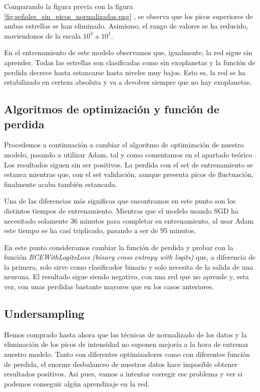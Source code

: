 Comparando la figura previa con la figura \ref{fig:señales_sin_picos_normalizadas.png} , se observa que los picos superiores de ambas estrellas se han eliminado. Asimismo, el rango de valores se ha reducido, moviendonos de la escala $10^3$ a $10^1$.


En el entrenamiento de este modelo observamos que, igualmente, la red sigue sin aprender. Todas las estrellas son clasificadas como sin exoplanetas y la función de perdida decrece hasta estancarse hasta niveles muy bajos. Esto es, la red se ha estabilizado en certeza absoluta y va a devolver siempre que no hay exoplanetas.

\subsection{Algoritmos de optimización y función de perdida}

Procedemos a continuación a cambiar el algoritmo de optimización de nuestro modelo, pasando a utilizar Adam, tal y como comentamos en el apartado teórico . Los resultados siguen sin ser positivos. La perdida con el set de entrenamiento se estanca mientras que, con el set validación, aunque presenta picos de fluctuación, finalmente acaba también estancada.

Una de las diferencias más significas que encontramos en este punto son los distintos tiempos de entrenamiento. Mientras que el modelo usando SGD ha necesitado solamente 36 minutos para completar su entrenamiento, al usar Adam este tiempo se ha casí triplicado, pasando a ser de 95 minutos.

En este punto consideramos cambiar la función de perdida y probar con la función \textit{BCEWithLogitsLoss (binary cross entropy with logits)} que, a diferencia de la primera, solo sirve como clasificador binario y solo necesita de la salida de una neurona. El resultado sigue siendo negativo, con una red que no aprende y, esta vez, con unas perdidas bastante mayores que en los casos anteriores.


\subsection{Undersampling}

Hemos comprado hasta ahora que las técnicas de normalizado de los datos y la eliminación de los picos de intensidad no suponen mejoría a la hora de entrenar nuestro modelo. Tanto con diferentes optimizadores como con diferentes función de perdida, el enorme desbalanceo de nuestros datos hace imposible obtener resultados positivos. Asi pues, vamos a intentar corregir ese problema y ver si podemos conseguir algún aprendizaje en la red.

